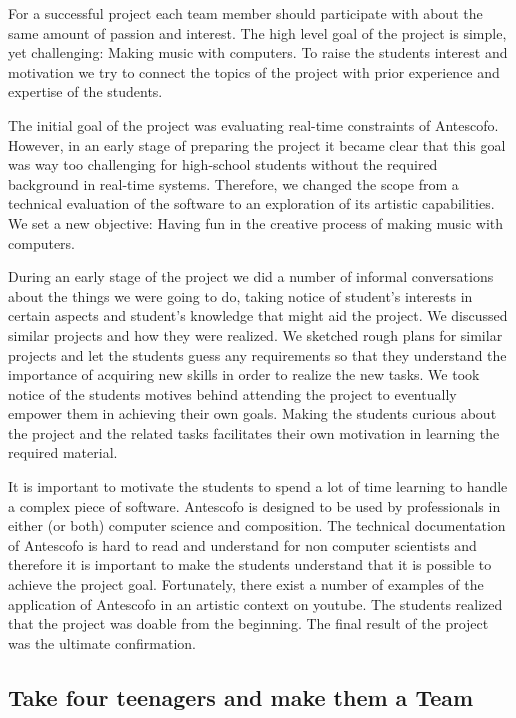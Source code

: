 \documentclass[onecolumn,nocopyrightspace,preprint]{sigplanconf}
\begin{document}
For a successful project each team member should participate with about the
same amount of passion and interest.  The high level goal of the project is
simple, yet challenging: Making music with computers. To raise the students
interest and motivation we try to connect the topics of the project with prior
experience and expertise of the students.

The initial goal of the project was evaluating real-time constraints of
Antescofo. However, in an early stage of preparing the project it became clear
that this goal was way too challenging for high-school students without the
required background in real-time systems. Therefore, we changed the scope from
a technical evaluation of the software to an exploration of its artistic
capabilities. We set a new objective: Having fun in the creative process of
making music with computers.

During an early stage of the project we did a number of informal conversations
about the things we were going to do, taking notice of student's interests in
certain aspects and student's knowledge that might aid the project. We discussed
similar projects and how they were realized. We sketched rough plans for similar
projects and let the students guess any requirements so that they understand
the importance of acquiring new skills in order to realize the new tasks. We
took notice of the students motives behind attending the project to eventually
empower them in achieving their own goals. Making the students curious about the
project and the related tasks facilitates their own motivation in learning the
required material.

It is important to motivate the students to spend a lot of time learning to
handle a complex piece of software. Antescofo is designed to be used by
professionals in either (or both) computer science and composition. The
technical documentation of Antescofo is hard to read and understand for non
computer scientists and therefore it is important to make the students
understand that it is possible to achieve the project goal. Fortunately, there
exist a number of examples of the application of Antescofo in an artistic
context on youtube. The students realized that the project was doable from the
beginning. The final result of the project was the ultimate confirmation.

\subsection{Take four teenagers and make them a Team}
\end{document}
